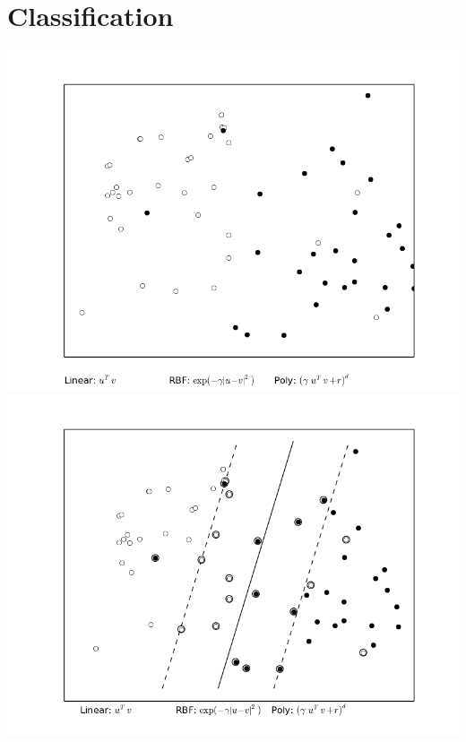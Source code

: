 \documentclass[12pt]{article}
\begin{document}
\section{Classification}
\includegraphics{images/Classification/data.png}
\includegraphics{images/Classification/analized_data.png}



\end{document}
